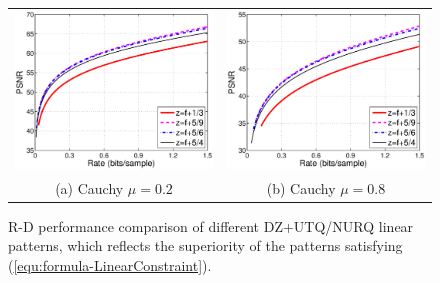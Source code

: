 \documentclass[smallabstract,smallcaptions]{dccpaper}
\begin{document}
\begin{figure}
\begin{center}
\begin{tabular}{cc}
\includegraphics[width = 0.5\linewidth]{Figures/section4/RD_Cauchy_mu=0_2_linear_patterns} &
\includegraphics[width = 0.5\linewidth]{Figures/section4/RD_Cauchy_mu=0_8_linear_patterns} \\
{\small (a) Cauchy $\mu=0.2$} & {\small (b) Cauchy $\mu=0.8$}
\end{tabular}
\end{center}
\vspace{-20pt}
\caption{\label{fig:RD_different_patterns}
R-D performance comparison of different DZ+UTQ/NURQ linear patterns, which reflects the superiority of the patterns satisfying (\ref{equ:formula-LinearConstraint}).}
\end{figure} 
\end{document}
